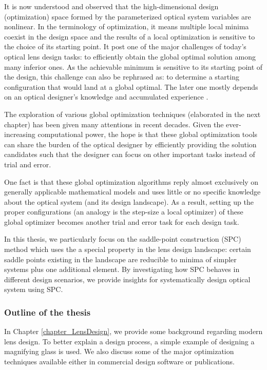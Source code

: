 It is now understood and observed that the high-dimensional design (optimization) space formed by the parameterized optical system variables are nonlinear. In the terminology of optimization, it means multiple local minima coexist in the design space and the results of a local optimization is sensitive to the choice of its starting point. It post one of the major challenges of today's optical lens design tasks: to efficiently obtain the global optimal solution among many inferior ones. As the achievable minimum is sensitive to its starting point of the design, this challenge can also be rephrased as: to determine a starting configuration that would land at a global optimal. The later one mostly depends on an optical designer's knowledge and accumulated experience \cite{LivshitsQA2013}\cite{Shafer1995_moreless}. 

The exploration of various global optimization techniques (elaborated in the next chapter) has been given many attentions in recent decades. Given the ever-increasing computational power, the hope is that these global optimization tools can share the burden of the optical designer by efficiently providing the solution candidates such that the designer can focus on other important tasks instead of trial and error. 

One fact is that these global optimization algorithms reply almost exclusively on generally applicable mathematical models and uses little or no specific knowledge about the optical system (and its design landscape). As a result, setting up the proper configurations (an analogy is the step-size a local optimizer) of these global optimizer becomes another trial and error task for each design task. 

In this thesis, we particularly focus on the saddle-point construction (SPC) method which uses the a special property in the lens design landscape: certain saddle points existing in the landscape are reducible to minima of simpler systems plus one additional element. By investigating how SPC behaves in different design scenarios, we provide insights for systematically design optical system using SPC. 



\subsubsection{Outline of the thesis}
In Chapter \ref{chapter_LensDesign}, we provide some background regarding modern lens design. To better explain a design process, a simple example of designing a magnifying glass is used. We also discuss some of the major optimization techniques available either in commercial design software or publications. 

